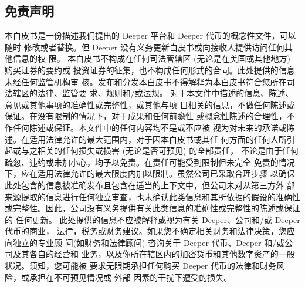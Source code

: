\documentclass[a4paper]{article}
\begin{document}
\begin{appendices}
\section{免责声明}
本白皮书是一份描述我们提出的 Deeper 平台和 Deeper 代币的概念性文件，可以随时 修改或者替换。但 Deeper 没有义务更新白皮书或向接收人提供访问任何其他信息的权 限。
本白皮书不构成在任何司法管辖区 (无论是在美国或其他地方) 购买证券的要约或 投资证券的征集，也不构成任何形式的合同。此处提供的信息未经任何监管机构审 核。发布和分发本白皮书不得解释为本白皮书符合您所在司法辖区的法律、监管要 求、规则和/或法规。
对于本文件中描述的信息、陈述、意见或其他事项的准确性或完整性，或其他与项 目相关的信息，不做任何陈述或保证。在没有限制的情况下，对于成果和任何前瞻性 或概念性陈述的合理性，不作任何陈述或保证。本文件中的任何内容均不是或不应被 视为对未来的承诺或陈述。在适用法律允许的最大范围内，对于因本白皮书或其任 何方面的任何人所引起或与之相关的任何损失或损害 (无论是否可预见) 的全部责任， 不论是由于任何疏忽、违约或未加小心，均予以免责。在责任可能受到限制但未完全 免责的情况下，应在适用法律允许的最大限度内加以限制。虽然公司已采取合理步骤 以确保此处包含的信息被准确发布且包含在适当的上下文中，但公司未对从第三方外 部来源提取的信息进行任何独立审查，也未确认此类信息和其所依据的假设的准确性 或完整性。因此，公司没有义务提供有关此类信息的准确性或完整性的陈述或保证的 任何更新。
此处提供的信息不应被解释或视为有关 Deeper、公司和/或 Deeper 代币的商业， 法律，税务或财务建议。如果您不确定相关财务和法律决策，您应向独立的专业顾 问(如财务和法律顾问) 咨询关于 Deeper 代币、Deeper 和/或公司及其各自的经营和 业务，以及你所在辖区内的加密货币和其他数字资产的一般状况。须知，您可能被 要求无限期承担任何购买 Deeper 代币的法律和财务风险，或承担在不可预见情况或 外部
因素的干扰下遭受的损失。
\end{appendices}




















\newpage



\end{document}
